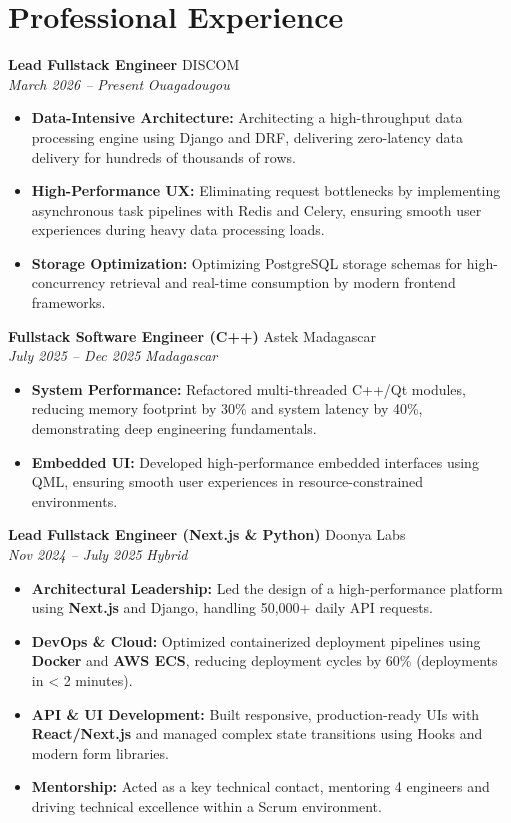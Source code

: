 \documentclass[a4paper,10pt]{article}
\newcommand{\jobheader}[4]{%
    \textbf{#1} \hfill #2 \\
    \textit{#3} \hfill \textit{#4}
    \vspace{0.05cm}
}
\begin{document}
\section*{Professional Experience}

\jobheader{Lead Fullstack Engineer}{DISCOM}{March 2026 -- Present}{Ouagadougou}
\begin{itemize}[leftmargin=*,nosep]
    \item \textbf{Data-Intensive Architecture:} Architecting a high-throughput data processing engine using Django and DRF, delivering zero-latency data delivery for hundreds of thousands of rows.
    \item \textbf{High-Performance UX:} Eliminating request bottlenecks by implementing asynchronous task pipelines with Redis and Celery, ensuring smooth user experiences during heavy data processing loads.
    \item \textbf{Storage Optimization:} Optimizing PostgreSQL storage schemas for high-concurrency retrieval and real-time consumption by modern frontend frameworks.
\end{itemize}

\vspace{0.15cm}

\jobheader{Fullstack Software Engineer (C++)}{Astek Madagascar}{July 2025 -- Dec 2025}{Madagascar}
\begin{itemize}[leftmargin=*,nosep]
    \item \textbf{System Performance:} Refactored multi-threaded C++/Qt modules, reducing memory footprint by 30\% and system latency by 40\%, demonstrating deep engineering fundamentals.
    \item \textbf{Embedded UI:} Developed high-performance embedded interfaces using QML, ensuring smooth user experiences in resource-constrained environments.
\end{itemize}

\vspace{0.15cm}

\jobheader{Lead Fullstack Engineer (Next.js \& Python)}{Doonya Labs}{Nov 2024 -- July 2025}{Hybrid}
\begin{itemize}[leftmargin=*,nosep]
    \item \textbf{Architectural Leadership:} Led the design of a high-performance platform using \textbf{Next.js} and Django, handling 50,000+ daily API requests.
    \item \textbf{DevOps \& Cloud:} Optimized containerized deployment pipelines using \textbf{Docker} and \textbf{AWS ECS}, reducing deployment cycles by 60\% (deployments in < 2 minutes).
    \item \textbf{API \& UI Development:} Built responsive, production-ready UIs with \textbf{React/Next.js} and managed complex state transitions using Hooks and modern form libraries.
    \item \textbf{Mentorship:} Acted as a key technical contact, mentoring 4 engineers and driving technical excellence within a Scrum environment.
\end{itemize}
\end{document}

